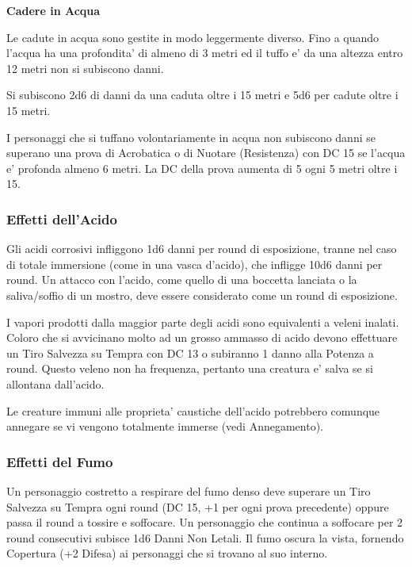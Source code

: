 \documentclass[a4paper,11pt,twoside,openany]{dndbook}
\begin{document}
{\textbf{Cadere in Acqua}

Le cadute in acqua sono gestite in modo leggermente diverso. Fino a quando l'acqua ha una profondita' di almeno di 3 metri ed il tuffo e' da una altezza entro 12 metri non si subiscono danni.

Si subiscono 2d6 di danni da una caduta oltre i 15 metri e 5d6 per cadute oltre i 15 metri.

I personaggi che si tuffano volontariamente in acqua non subiscono danni se superano una prova di Acrobatica o di Nuotare (Resistenza) con DC 15 se l'acqua e' profonda almeno 6 metri. La DC della prova aumenta di 5 ogni 5 metri oltre i 15.

\subsubsection{Effetti dell'Acido}

\label{effetti-dellacido}

Gli acidi corrosivi infliggono 1d6 danni per round di esposizione, tranne nel caso di totale immersione (come in una vasca d'acido), che infligge 10d6 danni per round. Un attacco con l'acido, come quello di una boccetta lanciata o la saliva/soffio di un mostro, deve essere considerato come un round di esposizione.

I vapori prodotti dalla maggior parte degli acidi sono equivalenti a veleni inalati. Coloro che si avvicinano molto ad un grosso ammasso di acido devono effettuare un Tiro Salvezza su Tempra con DC 13 o subiranno 1 danno alla Potenza a round. Questo veleno non ha frequenza, pertanto una creatura e' salva se si allontana dall'acido.

Le creature immuni alle proprieta' caustiche dell'acido potrebbero comunque annegare se vi vengono totalmente immerse (vedi Annegamento).

\subsubsection{Effetti del Fumo}

\label{effetti-del-fumo}

Un personaggio costretto a respirare del fumo denso deve superare un Tiro Salvezza su Tempra ogni round (DC 15, +1 per ogni prova precedente) oppure passa il round a tossire e soffocare. Un personaggio che continua a soffocare per 2 round consecutivi subisce 1d6 Danni Non Letali. Il fumo oscura la vista, fornendo Copertura (+2 Difesa) ai personaggi che si trovano al suo interno.

}
\end{document}
